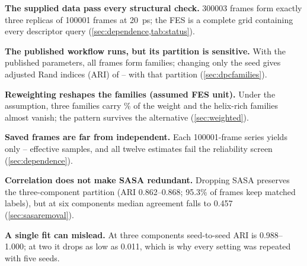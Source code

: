 \documentclass[a4paper,11pt,oneside,numbers=noenddot,headings=normal,bibliography=totoc,listof=totoc]{scrreprt}
\begin{document}
\begin{keyfindings}
\begin{findings}
\item \textbf{The supplied data pass every structural check.} \num{300003} frames form exactly three replicas of \num{100001} frames at 20~ps; the FES is a complete grid containing every descriptor query (\cref{sec:dependence,tab:status}).
\item \textbf{The published workflow runs, but its partition is sensitive.} With the published parameters, all frames form \DPCFamilies{} families; changing only the seed gives adjusted Rand indices (ARI) of \DPCSeedARIMin--\DPCSeedARIMax{} with that partition (\cref{sec:dpcfamilies}).
\item \textbf{Reweighting reshapes the families (assumed FES unit).} Under the \kJmol{} assumption, three families carry \WTopThree\% of the weight and the helix-rich families almost vanish; the pattern survives the \kcalmol{} alternative (\cref{sec:weighted}).
\item \textbf{Saved frames are far from independent.} Each \num{100001}-frame series yields only \ESSMinimum{}--\ESSMaximum{} effective samples, and all twelve estimates fail the reliability screen (\cref{sec:dependence}).
\item \textbf{Correlation does not make SASA redundant.} Dropping SASA preserves the three-component partition (ARI 0.862--0.868; 95.3\% of frames keep matched labels), but at six components median agreement falls to 0.457 (\cref{sec:sasaremoval}).
\item \textbf{A single fit can mislead.} At three components seed-to-seed ARI is 0.988--1.000; at two it drops as low as 0.011, which is why every setting was repeated with five seeds.
\end{findings}
\end{keyfindings}
\tableofcontents
\end{document}
